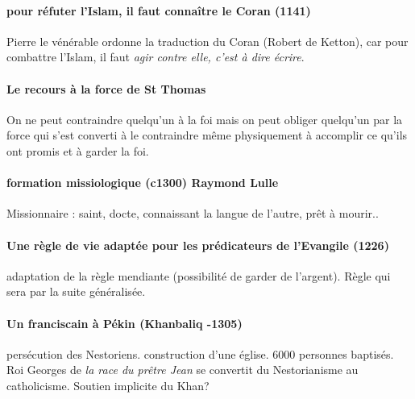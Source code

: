 \paragraph{pour réfuter l'Islam, il faut connaître le Coran (1141)} Pierre le vénérable ordonne la traduction du Coran (Robert de Ketton), car pour combattre l'Islam, il faut \textit{agir contre elle, c'est à dire écrire}.


\paragraph{Le recours à la force de St Thomas } On ne peut contraindre quelqu'un à la foi mais on peut obliger quelqu'un par la force qui s'est converti à le contraindre même physiquement à accomplir ce qu'ils ont promis et à garder la foi. 


\paragraph{formation missiologique (c1300) Raymond Lulle} Missionnaire : saint, docte, connaissant la langue de l'autre, prêt à mourir.. 

\paragraph{Une règle de vie adaptée pour les prédicateurs de l'Evangile (1226)} adaptation de la règle mendiante (possibilité de garder de l'argent). Règle qui sera par la suite généralisée.


\paragraph{Un franciscain à Pékin (Khanbaliq -1305)}  persécution des Nestoriens. construction d'une église. 6000 personnes baptisés. Roi Georges de \textit{la race du prêtre Jean} se convertit du Nestorianisme au catholicisme. Soutien implicite du Khan?


